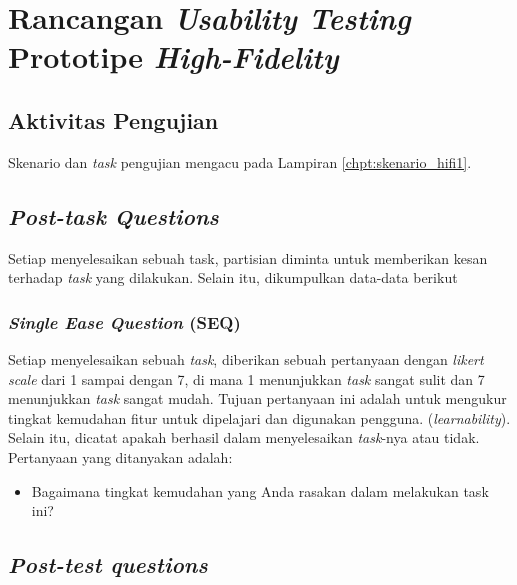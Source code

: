 \chapter{Rancangan \textit{Usability Testing} Prototipe \textit{High-Fidelity}}
\label{chpt:testing_hifi}

\newlength{\coln}
\setlength{\coln}{0.02\textwidth}

\newcommand{\apghead}[1]{\cellcolor[HTML]{A3E5F5}\textbf{#1}}
\newcommand{\apgheadcell}[1]{\multicolumn{1}{c|}{\apghead{#1}}}

\newcommand{\borderblue}{\arrayrulecolor[HTML]{A3E5F5}}
\newcommand{\borderblack}{\arrayrulecolor{black}}


\section{Aktivitas Pengujian}
Skenario dan \textit{task} pengujian mengacu pada Lampiran \ref{chpt:skenario_hifi1}.

\section{\textit{Post-task Questions}}

Setiap menyelesaikan sebuah task, partisian diminta untuk memberikan kesan terhadap \textit{task} yang dilakukan. Selain itu, dikumpulkan data-data berikut

\subsection{\textit{Single Ease Question} (SEQ)}

Setiap menyelesaikan sebuah \textit{task}, diberikan sebuah pertanyaan dengan \textit{likert scale} dari 1 sampai dengan 7, di mana 1 menunjukkan \textit{task} sangat sulit dan 7 menunjukkan \textit{task} sangat mudah. Tujuan pertanyaan ini adalah untuk mengukur tingkat kemudahan fitur untuk dipelajari dan digunakan pengguna. (\textit{learnability}). Selain itu, dicatat apakah berhasil dalam menyelesaikan \textit{task}-nya atau tidak. Pertanyaan yang ditanyakan adalah:

\begin{itemize}
  \item Bagaimana tingkat kemudahan yang Anda rasakan dalam melakukan task ini?
\end{itemize}

\section{\textit{Post-test questions}}

